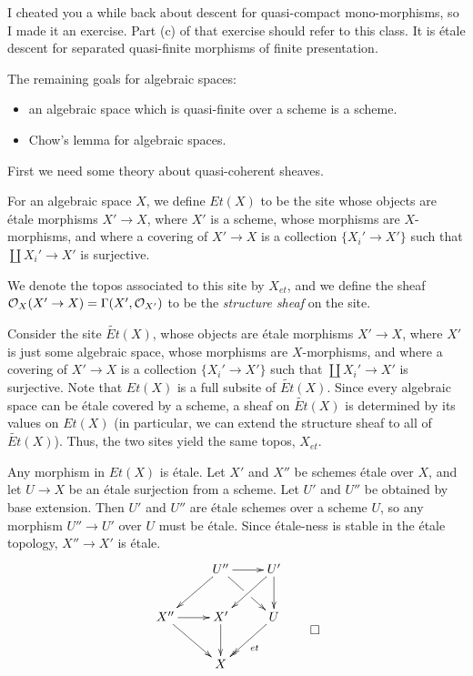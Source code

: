 
 I cheated you a while back about descent for quasi-compact mono-morphisms, so I made it
 an exercise. Part (c) of that exercise should refer to this class. It is \'etale descent
 for separated quasi-finite morphisms of finite presentation.

 The remaining goals for algebraic spaces:
 \begin{itemize}
   \item an algebraic space which is quasi-finite over a scheme is a scheme.
   \item Chow's lemma for algebraic spaces.
 \end{itemize}
 First we need some theory about quasi-coherent sheaves.
 \begin{definition}
   For an algebraic space $X$, we define $Et(X)$ to be the site whose objects
   are \'etale morphisms $X'\to X$, where $X'$ is a scheme, whose morphisms are
   $X$-morphisms, and where a covering of $X'\to X$ is a collection $\{X_i'\to X'\}$ such
   that $\coprod X_i'\to X'$ is surjective.

   We denote the topos associated to this site by $X_{et}$, and we define the sheaf
   $\mathcal{O}_X(X'\to X)=\Gamma(X',\mathcal{O}_{X'})$ to be the \emph{structure sheaf} on the site.
 \end{definition}
 \begin{remark}
   Consider the site $\widetilde{Et}(X)$, whose objects are \'etale morphisms $X'\to X$,
   where $X'$ is just some algebraic space, whose morphisms are $X$-morphisms, and where
   a covering of $X'\to X$ is a collection $\{X_i'\to X'\}$ such that $\coprod X_i'\to
   X'$ is surjective. Note that $Et(X)$ is a full subsite of $\widetilde{Et}(X)$. Since
   every algebraic space can be \'etale covered by a scheme, a sheaf on
   $\widetilde{Et}(X)$ is determined by its values on $Et(X)$ (in particular, we can
   extend the structure sheaf to all of $\widetilde{Et}(X)$). Thus, the two sites yield
   the same topos, $X_{et}$.
 \end{remark}
 \begin{remark}\label{lec15R:morphisms_of_etales_is_etale}
   Any morphism in $Et(X)$ is \'etale. Let $X'$ and $X''$ be schemes \'etale over $X$,
   and let $U\to X$ be an \'etale surjection from a scheme. Let $U'$ and $U''$ be
   obtained by base extension. Then $U'$ and $U''$ are \'etale schemes over a scheme $U$,
   so any morphism $U''\to U'$ over $U$ must be \'etale. Since \'etale-ness is stable in
   the \'etale topology, $X''\to X'$ is \'etale.
   \[\raisebox{4pc}{$\xymatrix{
    & U'' \ar[dr]|!{[r];[d]}\hole \ar[dl]\ar[r] & U'\ar[dl] \ar[d]\\
    X'' \ar[dr] \ar[r] & X' \ar[d] & U\ar@{->>}[dl]^{et}\\
    & X
   }$}\qedhere\]
 \end{remark}
